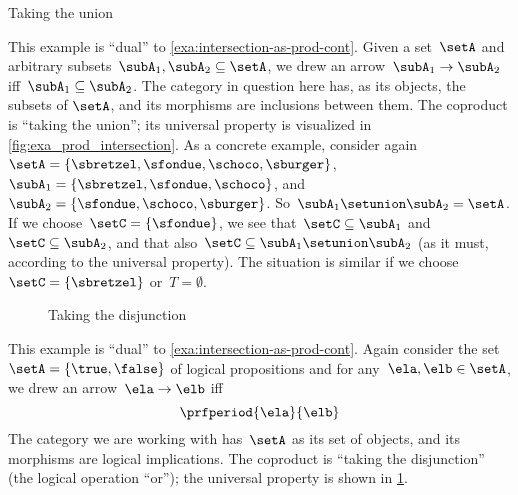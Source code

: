 \begin{marginfigure}
	\centering
	\caption{Taking the union}
	\label{fig:exa_coprod_union_cont}
\end{marginfigure}

\begin{example}
	\label{exa:union-as-coprod-cont}
	This example is ``dual'' to \cref{exa:intersection-as-prod-cont}.
	Given a set~$\setA$ and arbitrary subsets~$\subA_1, \subA_2 \subseteq \setA$, we drew an arrow~$\subA_1 \to \subA_2$ iff~$\subA_1 \subseteq \subA_2$.
	The category in question here has, as its objects, the subsets of $\setA$, and its morphisms are inclusions between them.
	The coproduct is ``taking the union''; its universal property is visualized in \cref{fig:exa_prod_intersection}.
	As a concrete example, consider again~$\setA = \{ \sbretzel, \sfondue, \schoco, \sburger \}$,~$\subA_1 = \{ \sbretzel, \sfondue, \schoco \}$, and~$\subA_2 = \{\sfondue, \schoco, \sburger \}$.
	So~$\subA_1 \setunion \subA_2 = \setA$.
	If we choose~$\setC = \{ \sfondue \}$, we see that~$\setC \subseteq \subA_1$ and~$\setC \subseteq \subA_2$, and that also~$\setC \subseteq \subA_1 \setunion \subA_2$ (as it must, according to the universal property).
	The situation is similar if we choose~$\setC = \{ \sbretzel \}$ or~$T = \emptyset$.
\end{example}

\begin{figure}
	\centering
	\caption{Taking the disjunction}
	\label{fig:exa_coprod_disjunction_cont}
\end{figure}

\begin{example}
	\label{exa:disjunction-as-coprod-cont}
	This example is ``dual'' to \cref{exa:intersection-as-prod-cont}.
	Again consider the set~$\setA = \{ \true, \false \}$ of logical propositions and for any~$\ela, \elb  \in \setA$, we drew an arrow~$\ela \to \elb$ iff
	\begin{equation*}
		\prfperiod{\ela}{\elb}
	\end{equation*}
	The category we are working with has~$\setA$ as its set of objects, and its morphisms are logical implications.
	The coproduct is ``taking the disjunction'' (the logical operation ``or''); the universal property is shown in \cref{fig:exa_coprod_disjunction_cont}.
\end{example}

